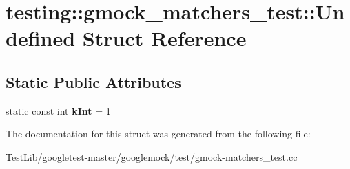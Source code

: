 \hypertarget{structtesting_1_1gmock__matchers__test_1_1Undefined}{}\section{testing\+:\+:gmock\+\_\+matchers\+\_\+test\+:\+:Undefined Struct Reference}
\label{structtesting_1_1gmock__matchers__test_1_1Undefined}
\subsection*{Static Public Attributes}
\begin{DoxyCompactItemize}
\item 
\mbox{\label{structtesting_1_1gmock__matchers__test_1_1Undefined_a59bddeb8647abbf50ee51b8ca8f0989b}} 
static const int {\bfseries k\+Int} = 1
\end{DoxyCompactItemize}


The documentation for this struct was generated from the following file\+:\begin{DoxyCompactItemize}
\item 
Test\+Lib/googletest-\/master/googlemock/test/gmock-\/matchers\+\_\+test.\+cc\end{DoxyCompactItemize}
